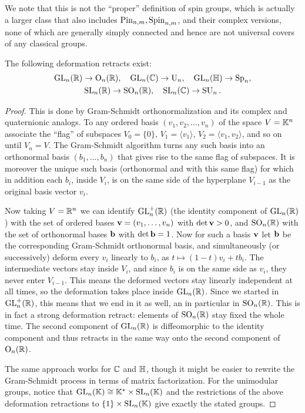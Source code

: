 We note that this is not the ``proper'' definition of spin groups, which is actually a larger class that also includes $\Pin_{n,m},\Spin_{n,m}$, and their complex versions, none of which are generally simply connected and hence are not universal covers of any classical groups.

\begin{prop}
    The following deformation retracts exist:
    \begin{gather}
        \GL_n(\bbR)\to \Or_n(\bbR),\quad \GL_n(\bbC)\to \U_n, \quad \GL_n(\bbH)\to \Sp_n,\\
        \SL_n(\bbR)\to \SO_n(\bbR),\quad \SL_n(\bbC)\to \SU_n.
    \end{gather}
\end{prop}
\begin{proof}
     This is done by Gram-Schmidt orthonormalization and its complex and quaternionic analogs. To any ordered basis $(v_1,v_2,\ldots,v_n)$ of the space $V=\bbK^n$ associate the ``flag'' of subspaces $V_0=\{0\}$, $V_1=\langle v_1\rangle$, $V_2=\langle v_1,v_2\rangle$, and so on until $V_n=V$. The Gram-Schmidt algorithm turns any such basis into an orthonormal basis $(b_1,\ldots,b_n)$ that gives rise to the same flag of subspaces. It is moreover the unique such basis (orthonormal and with this same flag) for which in addition each $b_i$, inside $V_i$, is on the same side of the hyperplane $V_{i-1}$ as the original basis vector $v_i$.

     Now taking $V=\bbR^n$ we can identify $\GL_n^+(\bbR)$ (the identity component of $\GL_n(\bbR)$) with the set of ordered bases $\bf{v}=(v_1,\ldots,v_n)$  with $\det \bf{v}>0$, and $\SO_n(\bbR)$ with the set of orthonormal bases $\bf{b}$ with $\det \bf{b}=1$. Now for such a basis $\bf{v}$ let $\bf{b}$ be the corresponding Gram-Schmidt orthonormal basis, and simultaneously (or successively) deform every $v_i$ linearly to $b_i$, as $t\mapsto (1-t)v_i+t b_i$. The intermediate vectors stay inside $V_i$, and since $b_i$ is on the same side as $v_i$, they never enter $V_{i-1}$. This means the deformed vectors stay linearly independent at all times, so the deformation takes place inside $\GL_n(\bbR)$. Since we started in $\GL^+_n(\bbR)$, this means that we end in it as well, an in particular in $\SO_n(\bbR)$. This is in fact a strong deformation retract: elements of $\SO_n(\bbR)$ stay fixed the whole time. The second component of $\GL_n(\bbR)$ is diffeomorphic to the identity component and thus retracts in the same way onto the second component of $\Or_n(\bbR)$.

     The same approach works for $\bbC$ and $\bbH$, though it might be easier to rewrite the Gram-Schmidt process in terms of matrix factorization. For the unimodular groups, notice that $\GL_n(\bbK)\cong \bbK^\ast \times \SL_n(\bbK)$ and the restrictions of the above deformation retractions to $\{1\}\times \SL_n(\bbK)$ give exactly the stated groups.
\end{proof}


